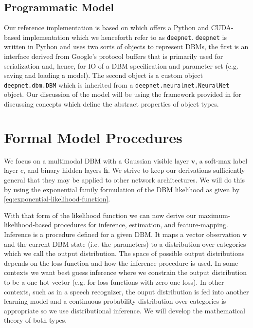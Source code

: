 \documentclass{article} %
\begin{document}
\subsection{Programmatic Model}

Our reference implementation is based on \cite{srivastava2014deepnet} which offers a Python and CUDA-based implementation which we
henceforth refer to as \texttt{deepnet}. \texttt{deepnet} is written in Python and uses two sorts of objects to represent DBMs, the first is
an interface derived from Google's protocol buffers that is primarily used for serialization and, hence, for IO of a DBM specification 
and parameter set (e.g. saving and loading a model).  The second object is a custom object \texttt{deepnet.dbm.DBM} which is
inherited from a \texttt{deepnet.neuralnet.NeuralNet} object. Our discussion of the model will be using the framework provided in
\cite{stepanov2009elements} for discussing concepts which define the abstract properties of object types. 



\section{Formal Model Procedures}

We focus on a multimodal DBM \cite{JMLR:v15:srivastava14b} with a
Gaussian visible layer $\mathbf{v}$, a soft-max label layer $c$, and
binary hidden layers $\overline{\mathbf{h}}$. We strive to keep our
derivations sufficiently general that they may be applied to other
network architectures.  We will do this by using the exponential family
formulation of the DBM likelihood as given by \autoref{eq:exponential-likelihood-function}.

With that form of the likelihood function we
can now derive our maximum-likelihood-based procedures for inference,
estimation, and feature-mapping.  Inference is a procedure defined for
a given DBM.  It maps a vector observation $\mathbf{v}$ and the
current DBM state (i.e. the parameters) to a distribution over
categories which we call the output distribution.  The space of
possible output distributions depends on the loss function and how the
inference procedure is used.  In some contexts we want best guess
inference where we constrain the output distribution to be a one-hot
vector (e.g. for loss functions with zero-one loss).  In other
contexts, such as in a speech recognizer, the ouput distribution is
fed into another learning model and a continuous probability
distribution over categories is appropriate so we use distributional inference.  We will develop the mathematical
theory of both types.
\end{document}
